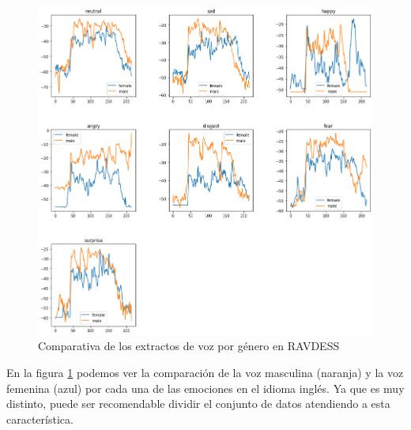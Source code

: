 \documentclass[11pt,a4paper,spanish]{book}
\begin{document}
	\begin{figure}[H]
		\centering
		\includegraphics[scale=0.35]{comparative_waveform.png} 
		\caption{Comparativa de los extractos de voz por género en RAVDESS}
		\label{fig:comp_emociones_genero}
	\end{figure}
	En la figura \ref{fig:comp_emociones_genero} podemos ver la comparación de la voz masculina (naranja) y la voz femenina (azul) por cada una de las emociones en el idioma inglés. Ya que es muy distinto, puede ser recomendable dividir el conjunto de datos atendiendo a esta característica.
	
	
	

	
\end{document}
